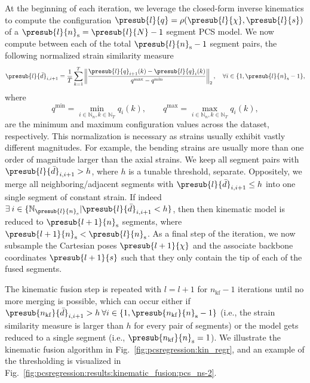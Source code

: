 At the beginning of each iteration, we leverage the closed-form inverse kinematics to compute the configuration $\presub{l}{q} = \rho(\presub{l}{\chi}, \presub{l}{s}) $ of a $\presub{l}{n}_\mathrm{s} = \presub{l}{N} - 1$ segment \gls{PCS} model. We now compute between each of the total $\presub{l}{n}_\mathrm{s} - 1$ segment pairs, the following normalized strain similarity measure
\begin{equation}
    \presub{l}{\bar{d}}_{i,i+1} = \frac{1}{T} \sum_{k=1}^T \left \lVert \frac{\presub{l}{q}_{i+1}(k) - \presub{l}{q}_i(k)}{q^\mathrm{max} - q^\mathrm{min}} \right \rVert_2, \quad \forall i \in \{1, \presub{l}{n}_\mathrm{s}-1 \},
\end{equation}
where
\begin{equation}
    q^\mathrm{min} = \min_{i \in \mathbb{N}_{n}, k \in \mathbb{N}_T} q_i(k), 
    \qquad 
    q^\mathrm{max} = \max_{i \in \mathbb{N}_{n}, k \in \mathbb{N}_T} q_i(k),
\end{equation}
are the minimum and maximum configuration values across the dataset, respectively. This normalization is necessary as strains usually exhibit vastly different magnitudes. For example, the bending strains are usually more than one order of magnitude larger than the axial strains.
We keep all segment pairs with $\presub{l}{\bar{d}}_{i,i+1} > h$, where $h$ is a tunable threshold, separate. Oppositely, we merge all neighboring/adjacent segments with $\presub{l}{\bar{d}}_{i,i+1} \leq h$ into one single segment of constant strain.
If indeed $\exists \: i \in \{ \mathbb{N}_{\presub{l}{n}_\mathrm{s}} | \presub{l}{\bar{d}}_{i,i+1} < h \}$, then then kinematic model is reduced to $\presub{l+1}{n}_\mathrm{s}$ segments, where $\presub{l+1}{n}_\mathrm{s} < \presub{l}{n}_\mathrm{s}$.
As a final step of the iteration, we now subsample the Cartesian poses $\presub{l+1}{\chi}$ and the associate backbone coordinates $\presub{l+1}{s}$ such that they only contain the tip of each of the fused segments.

The kinematic fusion step is repeated with $l = l + 1$ for $n_\mathrm{kf}-1$ iterations until no more merging is possible, which can occur either if $\presub{n_\mathrm{kf}}{{\bar{d}}}_{i,i+1} > h \: \forall i \in \{1, \presub{n_\mathrm{kf}}{n}_\mathrm{s}-1 \}$ (i.e., the strain similarity measure is larger than $h$ for every pair of segments) or the model gets reduced to a single segment (i.e., $\presub{n_\mathrm{kf}}{n}_\mathrm{s} = 1$).
We illustrate the kinematic fusion algorithm in Fig.~\ref{fig:pcsregression:kin_regr}, and an example of the thresholding is visualized in Fig.~\ref{fig:pcsregression:results:kinematic_fusion:pcs_ns-2}.


